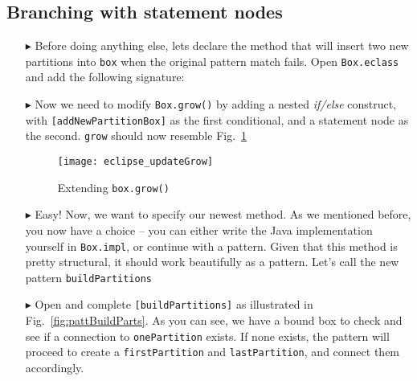 \newpage
\hypertarget{conBran tex}{}
\subsection{Branching with statement nodes}
\texHeader

\begin{itemize}

\item[$\blacktriangleright$] Before doing anything else, lets declare the method that will insert two new partitions into \texttt{box} when the original pattern
match fails. Open \texttt{Box.eclass} and add the following signature: 

\vspace{0.5cm}

\item[$\blacktriangleright$] Now we need to modify \texttt{Box.grow()} by adding a nested \emph{if/else} construct, with \texttt{[addNewPartitionBox]} as the
first conditional, and a statement node as the second. \texttt{grow} should now resemble Fig.~\ref{fig:updateGrow}

\vspace{0.5cm}

\begin{figure}[htp]
\begin{center}
  \texttt{[image: eclipse\_updateGrow]}
  \caption{Extending \texttt{box.grow()}}
  \label{fig:updateGrow}
\end{center}
\end{figure}

\vspace{0.5cm}

\item[$\blacktriangleright$] Easy! Now, we want to specify our newest method. As we mentioned before, you now have a choice -- you can either write the Java
implementation yourself in \texttt{Box.impl}, or continue with a pattern. Given that this method is pretty structural, it should work beautifully as a pattern.
Let's call the new pattern \texttt{buildPartitions}

\vspace{0.5cm}

\item[$\blacktriangleright$] Open and complete \texttt{[buildPartitions]} as illustrated in Fig.~\ref{fig:pattBuildParts}. As you can see, we have a bound
box to check and see if a connection to \texttt{onePartition} exists. If none exists, the pattern will proceed to create a \texttt{firstPartition} and
\texttt{lastPartition}, and connect them accordingly.


\end{itemize}
